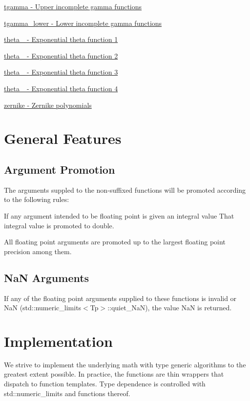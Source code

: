\begin{DoxyItemize}
\item \hyperlink{group__gnu__math__spec__func_ga6133351c7602e917fd08d62d897e57d0}{tgamma -\/ Upper incomplete gamma functions}
\item \hyperlink{group__gnu__math__spec__func_ga973fba718e906a5179d954c56b991c8d}{tgamma\+\_\+lower -\/ Lower incomplete gamma functions}
\item \hyperlink{group__gnu__math__spec__func_gac122af3ffd2e5536fdf021afce79b7d4}{theta\+\_ -\/ Exponential theta function 1}
\item \hyperlink{group__gnu__math__spec__func_gacec36dc316e561bbaa371c60c06e52f7}{theta\+\_ -\/ Exponential theta function 2}
\item \hyperlink{group__gnu__math__spec__func_ga34e5d79e6ba8b8b104e690fc1ebc7fd6}{theta\+\_ -\/ Exponential theta function 3}
\item \hyperlink{group__gnu__math__spec__func_ga25e72f2b50b53d168f8fa653b1a0d012}{theta\+\_ -\/ Exponential theta function 4}
\item \hyperlink{group__gnu__math__spec__func_ga5df3bb50b78cd1bc676763dbf9e64929}{zernike -\/ Zernike polynomials}
\end{DoxyItemize}\hypertarget{index_general}{}\section{General Features}\label{index_general}
\hypertarget{index_promotion}{}\subsection{Argument Promotion}\label{index_promotion}
The arguments suppled to the non-\/suffixed functions will be promoted according to the following rules\+:
\begin{DoxyEnumerate}
\item If any argument intended to be floating point is given an integral value That integral value is promoted to double.
\item All floating point arguments are promoted up to the largest floating point precision among them.
\end{DoxyEnumerate}\hypertarget{index_NaN}{}\subsection{Na\+N Arguments}\label{index_NaN}
If any of the floating point arguments supplied to these functions is invalid or NaN (std\+::numeric\+\_\+limits$<$\+Tp$>$\+::quiet\+\_\+\+NaN), the value NaN is returned.\hypertarget{index_impl}{}\section{Implementation}\label{index_impl}
We strive to implement the underlying math with type generic algorithms to the greatest extent possible. In practice, the functions are thin wrappers that dispatch to function templates. Type dependence is controlled with std\+::numeric\+\_\+limits and functions thereof.

